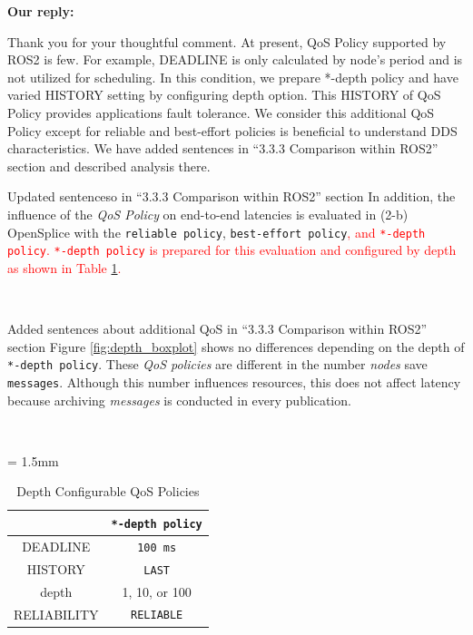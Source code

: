 \documentclass{article}
\begin{document}
\begin{enumerate}
  \begin{flushleft}
    \textbf{Our reply:}
  \end{flushleft}
  Thank you for your thoughtful comment.
  At present, QoS Policy supported by ROS2 is few.
  For example, DEADLINE is only calculated by node's period and is not utilized for scheduling.
  In this condition, we prepare *-depth policy and have varied HISTORY setting by configuring depth option.
  This HISTORY of QoS Policy provides applications fault tolerance.
  We consider this additional QoS Policy except for reliable and best-effort policies is beneficial to understand DDS characteristics.
  We have added sentences in ``3.3.3 Comparison within ROS2'' section and described analysis there.
  \begin{itembox}[|]{Updated sentenceso in ``3.3.3 Comparison within ROS2'' section}
    In addition, the influence of the \emph{QoS Policy} on end-to-end latencies is evaluated in (2-b) OpenSplice with the \texttt{reliable policy}, \texttt{best-effort policy}\textcolor{red}{, and \texttt{*-depth policy}.
      \texttt{*-depth policy} is prepared for this evaluation and configured by depth as shown in Table \ref{tb:depth_qos}.}
  \end{itembox}\\
  \begin{itembox}[|]{Added sentences about additional QoS in ``3.3.3 Comparison within ROS2'' section}
    Figure \ref{fig:depth_boxplot} shows no differences depending on the depth of \texttt{*-depth policy}.
    These \emph{QoS policies} are different in the number \emph{nodes} save \texttt{messages}.
    Although this number influences resources, this does not affect latency because archiving \emph{messages} is conducted in every publication.
  \end{itembox}\\
  \renewcommand{\arraystretch}{1.0}
  \setcounter{table}{4}
  \begin{table}[H]
    \caption{\label{tb:depth_qos}Depth Configurable QoS Policies}
    \centering
    \tabcolsep = 1.5mm              %
    \begin{tabular}{c|c}
      \hline
      & \textbf{\texttt{*-depth policy} }\\
      \hline
      \hline
      DEADLINE & \texttt{100 ms}\\
      HISTORY & \texttt{LAST}\\
      depth & 1, 10, or 100\\
      RELIABILITY & \texttt{RELIABLE}\\

\end{tabular}
\end{table}
\end{enumerate}
\end{document}
